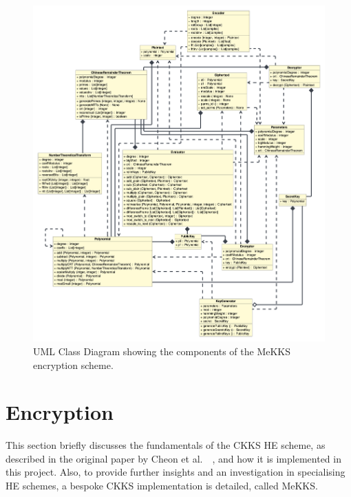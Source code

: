 \begin{figure}[htp]
    \centering
    \includegraphics[scale=0.19]{figures/mekksClasses}
    \captionsetup{justification=centering}
    \caption[MeKKS UML Class Diagram]{UML Class Diagram showing the components of the MeKKS encryption scheme.}
    \label{fig:mekksUML}
\end{figure}

\setlength{\leftskip}{0cm}





\section{Encryption}
\setlength{\leftskip}{0.25cm}
\indent \indent
This section briefly discusses the fundamentals of the CKKS HE scheme, as described in the original paper by Cheon et al.\ ~\cite{CKKS}, and how it is implemented in this project.  Also, to provide further insights and an investigation in specialising HE schemes, a bespoke CKKS implementation is detailed, called MeKKS. 

\setlength{\leftskip}{0cm}
